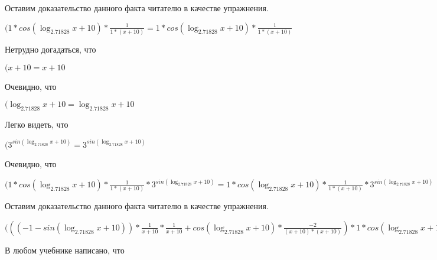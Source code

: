 \documentclass[12pt,a4paper,fleqn]{article}
\theoremstyle{definition}
\begin{document}
Оставим доказательство данного факта читателю в качестве упражнения.

$( 1  * cos(\log_{ 2.71828 }{ x  +  10 }) * \frac{ 1 }{ 1  * ( x  +  10 )}
 =  1  * cos(\log_{ 2.71828 }{ x  +  10 }) * \frac{ 1 }{ 1  * ( x  +  10 )}
$

Нетрудно догадаться, что

$( x  +  10  =  x  +  10 $

Очевидно, что

$(\log_{ 2.71828 }{ x  +  10 } = \log_{ 2.71828 }{ x  +  10 }$

Легко видеть, что

$({ 3 }^{sin(\log_{ 2.71828 }{ x  +  10 })} = { 3 }^{sin(\log_{ 2.71828 }{ x  +  10 })}$

Очевидно, что

$( 1  * cos(\log_{ 2.71828 }{ x  +  10 }) * \frac{ 1 }{ 1  * ( x  +  10 )}
 * { 3 }^{sin(\log_{ 2.71828 }{ x  +  10 })} =  1  * cos(\log_{ 2.71828 }{ x  +  10 }) * \frac{ 1 }{ 1  * ( x  +  10 )}
 * { 3 }^{sin(\log_{ 2.71828 }{ x  +  10 })}$

Оставим доказательство данного факта читателю в качестве упражнения.

$((( -1  - sin(\log_{ 2.71828 }{ x  +  10 })) * \frac{ 1 }{ x  +  10 }
 * \frac{ 1 }{ x  +  10 }
 + cos(\log_{ 2.71828 }{ x  +  10 }) * \frac{ -2 }{( x  +  10 ) * ( x  +  10 )}
) *  1  * cos(\log_{ 2.71828 }{ x  +  10 }) * \frac{ 1 }{ 1  * ( x  +  10 )}
 * { 3 }^{sin(\log_{ 2.71828 }{ x  +  10 })} = (( -1  - sin(\log_{ 2.71828 }{ x  +  10 })) * \frac{ 1 }{ x  +  10 }
 * \frac{ 1 }{ x  +  10 }
 + cos(\log_{ 2.71828 }{ x  +  10 }) * \frac{ -2 }{( x  +  10 ) * ( x  +  10 )}
) *  1  * cos(\log_{ 2.71828 }{ x  +  10 }) * \frac{ 1 }{ 1  * ( x  +  10 )}
 * { 3 }^{sin(\log_{ 2.71828 }{ x  +  10 })}$

В любом учебнике написано, что
\end{document}
